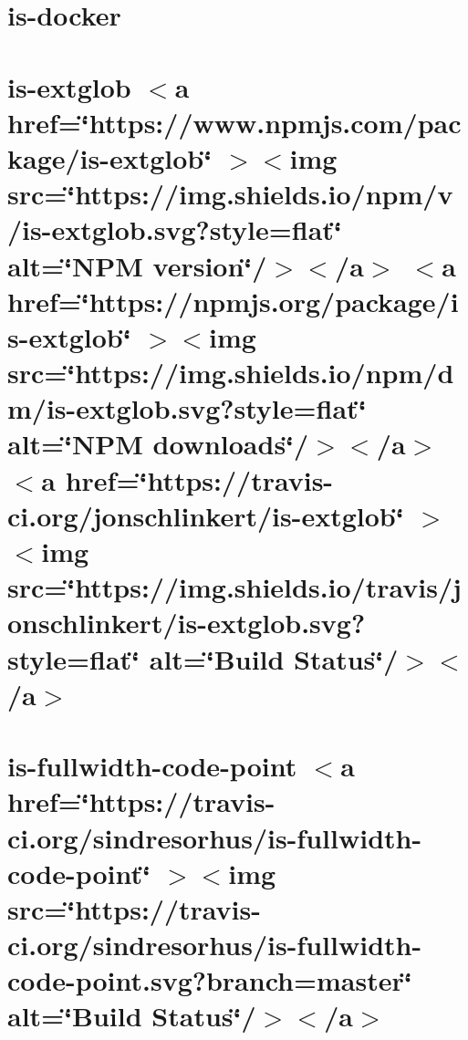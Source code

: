 \documentclass[twoside]{book}
\newcommand{\+}{\discretionary{\mbox{\scriptsize$\hookleftarrow$}}{}{}}
\begin{document}
\chapter{is-\/docker}
\label{md__c___users_vaishnavi_jadhav__desktop__developer_code_mean_stack_example_client_node_modules_is_docker_readme}

\chapter{is-\/extglob \texorpdfstring{$<$}{<}a href=\char`\"{}https\+://www.\+npmjs.\+com/package/is-\/extglob\char`\"{} \texorpdfstring{$>$}{>}\texorpdfstring{$<$}{<}img src=\char`\"{}https\+://img.\+shields.\+io/npm/v/is-\/extglob.\+svg?style=flat\char`\"{} alt=\char`\"{}\+NPM version\char`\"{}/\texorpdfstring{$>$}{>}\texorpdfstring{$<$}{<}/a\texorpdfstring{$>$}{>} \texorpdfstring{$<$}{<}a href=\char`\"{}https\+://npmjs.\+org/package/is-\/extglob\char`\"{} \texorpdfstring{$>$}{>}\texorpdfstring{$<$}{<}img src=\char`\"{}https\+://img.\+shields.\+io/npm/dm/is-\/extglob.\+svg?style=flat\char`\"{} alt=\char`\"{}\+NPM downloads\char`\"{}/\texorpdfstring{$>$}{>}\texorpdfstring{$<$}{<}/a\texorpdfstring{$>$}{>} \texorpdfstring{$<$}{<}a href=\char`\"{}https\+://travis-\/ci.\+org/jonschlinkert/is-\/extglob\char`\"{} \texorpdfstring{$>$}{>}\texorpdfstring{$<$}{<}img src=\char`\"{}https\+://img.\+shields.\+io/travis/jonschlinkert/is-\/extglob.\+svg?style=flat\char`\"{} alt=\char`\"{}\+Build Status\char`\"{}/\texorpdfstring{$>$}{>}\texorpdfstring{$<$}{<}/a\texorpdfstring{$>$}{>}}
\label{md__c___users_vaishnavi_jadhav__desktop__developer_code_mean_stack_example_client_node_modules_is_extglob__r_e_a_d_m_e}

\chapter{is-\/fullwidth-\/code-\/point \texorpdfstring{$<$}{<}a href=\char`\"{}https\+://travis-\/ci.\+org/sindresorhus/is-\/fullwidth-\/code-\/point\char`\"{} \texorpdfstring{$>$}{>}\texorpdfstring{$<$}{<}img src=\char`\"{}https\+://travis-\/ci.\+org/sindresorhus/is-\/fullwidth-\/code-\/point.\+svg?branch=master\char`\"{} alt=\char`\"{}\+Build Status\char`\"{}/\texorpdfstring{$>$}{>}\texorpdfstring{$<$}{<}/a\texorpdfstring{$>$}{>}}
\label{md__c___users_vaishnavi_jadhav__desktop__developer_code_mean_stack_example_client_node_modules_is_fullwidth_code_point_readme}

\end{document}
